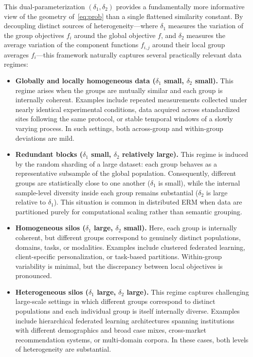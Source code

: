 \documentclass{article}
\theoremstyle{plain}
\begin{document}
This dual-parameterization $(\delta_1,\delta_2)$ provides a fundamentally more informative view of the geometry of~\eqref{eq:prob} than a single flattened similarity constant. By decoupling distinct sources of heterogeneity---where $\delta_1$ measures the variation of the group objectives $f_i$ around the global objective $f$, and $\delta_2$ measures the average variation of the component functions $f_{i,j}$ around their local group averages $f_i$---this framework naturally captures several practically relevant data regimes:
\begin{itemize}%
    \item \textbf{Globally and locally homogeneous data ($\delta_1$ small, $\delta_2$ small).}
    This regime arises when the groups are mutually similar and each group is internally coherent. Examples include repeated measurements collected under nearly identical experimental conditions, data acquired across standardized sites following the same protocol, or stable temporal windows of a slowly varying process. In such settings, both across-group and within-group deviations are mild.

    \item \textbf{Redundant blocks ($\delta_1$ small, $\delta_2$ relatively large).}
    This regime is induced by the random sharding of a large dataset: each group behaves as a representative subsample of the global population. Consequently, different groups are statistically close to one another ($\delta_1$ is small), while the internal sample-level diversity inside each group remains substantial ($\delta_2$ is large relative to $\delta_1$). This situation is common in distributed ERM when data are partitioned purely for computational scaling rather than semantic grouping.

    \item \textbf{Homogeneous silos ($\delta_1$ large, $\delta_2$ small).}
    Here, each group is internally coherent, but different groups correspond to genuinely distinct populations, domains, tasks, or modalities. Examples include clustered federated learning, client-specific personalization, or task-based partitions. Within-group variability is minimal, but the discrepancy between local objectives is pronounced.

    \item \textbf{Heterogeneous silos ($\delta_1$ large, $\delta_2$ large).}
    This regime captures challenging large-scale settings in which different groups correspond to distinct populations and each individual group is itself internally diverse. Examples include hierarchical federated learning architectures \citep{liu2020client} spanning institutions with different demographics and broad case mixes, cross-market recommendation systems, or multi-domain corpora. In these cases, both levels of heterogeneity are substantial.
\end{itemize}
\end{document}
